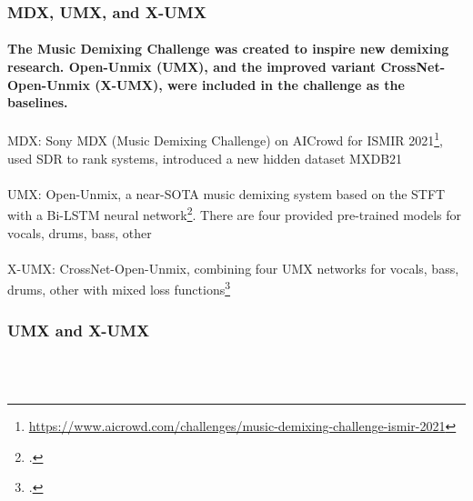 \documentclass[usenames,dvipsnames]{beamer}
\begin{document}
\begin{frame}
	\frametitle{MDX, UMX, and X-UMX}
	\framesubtitle{The Music Demixing Challenge was created to inspire new demixing research. Open-Unmix (UMX), and the improved variant CrossNet-Open-Unmix (X-UMX), were included in the challenge as the baselines.}
	MDX: Sony MDX (Music Demixing Challenge) on AICrowd for ISMIR 2021\footnote{\url{https://www.aicrowd.com/challenges/music-demixing-challenge-ismir-2021}}, used SDR to rank systems, introduced a new hidden dataset MXDB21\\\ \\
	UMX: Open-Unmix, a near-SOTA music demixing system based on the STFT with a Bi-LSTM neural network\footcite{umx}. There are four provided pre-trained models for vocals, drums, bass, other\\\ \\
	X-UMX: CrossNet-Open-Unmix, combining four UMX networks for vocals, bass, drums, other with mixed loss functions\footcite{xumx}
\end{frame}

\begin{frame}
	\frametitle{UMX and X-UMX}
	\begin{figure}[ht]
		\centering
		\\
		\\
	\end{figure}
\end{frame}
\end{document}
